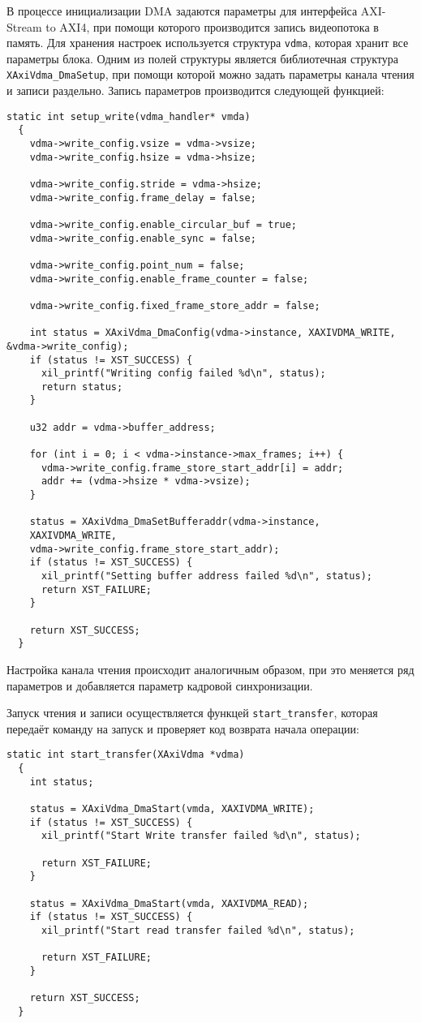 В процессе инициализации DMA задаются параметры для интерфейса AXI-Stream to
AXI4, при помощи которого производится запись видеопотока в память. Для
хранения настроек используется структура \texttt{vdma}, которая хранит
все параметры блока. Одним из полей структуры является библиотечная
структура \texttt{XAxiVdma\_DmaSetup}, при помощи которой можно
задать параметры канала чтения и записи раздельно. Запись параметров
производится следующей функцией:
\medskip
\begin{lstlisting}[style=C]
  static int setup_write(vdma_handler* vmda)
  {
    vdma->write_config.vsize = vdma->vsize;
    vdma->write_config.hsize = vdma->hsize;

    vdma->write_config.stride = vdma->hsize;
    vdma->write_config.frame_delay = false;

    vdma->write_config.enable_circular_buf = true;
    vdma->write_config.enable_sync = false;

    vdma->write_config.point_num = false;
    vdma->write_config.enable_frame_counter = false;

    vdma->write_config.fixed_frame_store_addr = false;

    int status = XAxiVdma_DmaConfig(vdma->instance, XAXIVDMA_WRITE, &vdma->write_config);
    if (status != XST_SUCCESS) {
      xil_printf("Writing config failed %d\n", status);
      return status;
    }

    u32 addr = vdma->buffer_address;

    for (int i = 0; i < vdma->instance->max_frames; i++) {
      vdma->write_config.frame_store_start_addr[i] = addr;
      addr += (vdma->hsize * vdma->vsize);
    }

    status = XAxiVdma_DmaSetBufferaddr(vdma->instance,
    XAXIVDMA_WRITE,
    vdma->write_config.frame_store_start_addr);
    if (status != XST_SUCCESS) {
      xil_printf("Setting buffer address failed %d\n", status);
      return XST_FAILURE;
    }

    return XST_SUCCESS;
  }
\end{lstlisting}
\medskip

Настройка канала чтения происходит аналогичным образом, при это меняется ряд параметров
и добавляется параметр кадровой синхронизации.

Запуск чтения и записи осуществляется функцей \texttt{start\_transfer}, которая
передаёт команду на запуск и проверяет код возврата начала операции:
\medskip
\begin{lstlisting}[style=C]
  static int start_transfer(XAxiVdma *vdma)
  {
	int status;

	status = XAxiVdma_DmaStart(vmda, XAXIVDMA_WRITE);
	if (status != XST_SUCCESS) {
      xil_printf("Start Write transfer failed %d\n", status);

      return XST_FAILURE;
	}

	status = XAxiVdma_DmaStart(vmda, XAXIVDMA_READ);
	if (status != XST_SUCCESS) {
      xil_printf("Start read transfer failed %d\n", status);

      return XST_FAILURE;
	}

	return XST_SUCCESS;
  }
\end{lstlisting}
\medskip